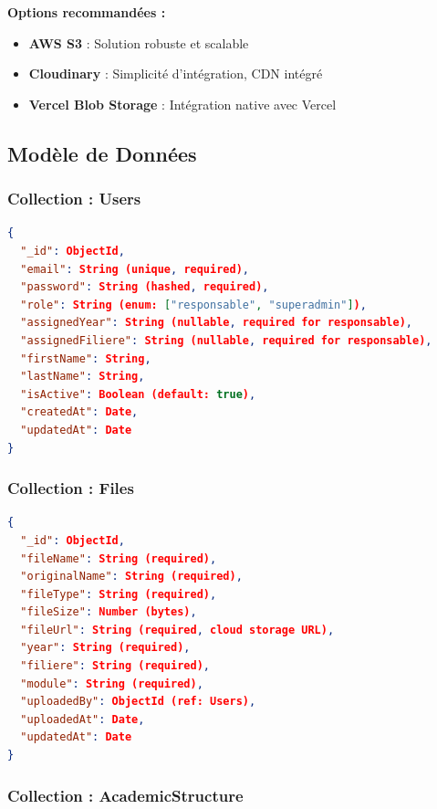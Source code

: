 \documentclass[12pt,a4paper]{article}
\begin{document}
\textbf{Options recommandées :}
\begin{itemize}[leftmargin=*]
    \item \textbf{AWS S3} : Solution robuste et scalable
    \item \textbf{Cloudinary} : Simplicité d'intégration, CDN intégré
    \item \textbf{Vercel Blob Storage} : Intégration native avec Vercel
\end{itemize}

\subsection{Modèle de Données}

\subsubsection{Collection : Users}

\begin{lstlisting}[language=json, basicstyle=\small\ttfamily]
{
  "_id": ObjectId,
  "email": String (unique, required),
  "password": String (hashed, required),
  "role": String (enum: ["responsable", "superadmin"]),
  "assignedYear": String (nullable, required for responsable),
  "assignedFiliere": String (nullable, required for responsable),
  "firstName": String,
  "lastName": String,
  "isActive": Boolean (default: true),
  "createdAt": Date,
  "updatedAt": Date
}
\end{lstlisting}

\subsubsection{Collection : Files}

\begin{lstlisting}[language=json, basicstyle=\small\ttfamily]
{
  "_id": ObjectId,
  "fileName": String (required),
  "originalName": String (required),
  "fileType": String (required),
  "fileSize": Number (bytes),
  "fileUrl": String (required, cloud storage URL),
  "year": String (required),
  "filiere": String (required),
  "module": String (required),
  "uploadedBy": ObjectId (ref: Users),
  "uploadedAt": Date,
  "updatedAt": Date
}
\end{lstlisting}

\subsubsection{Collection : AcademicStructure}
\end{document}
